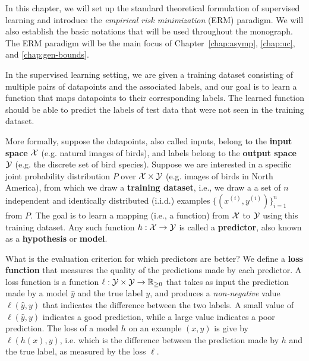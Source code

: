 
\setcounter{section}{0}



In this chapter, we will set up the standard theoretical formulation of supervised learning and introduce the \textit{empirical risk minimization} (ERM) paradigm. 
We will also establish the basic notations that will be used throughout the monograph.
The ERM paradigm will be the main focus of Chapter~\ref{chap:asymp}, \ref{chap:uc}, and \ref{chap:gen-bounds}. 

\label{lec1:sec:sup-learn}
In the supervised learning setting, we are given a training dataset consisting of multiple pairs of datapoints and the associated labels, and our goal is to learn a function that maps datapoints to their corresponding labels. The learned function should be able to predict the labels of test data that were not seen in the training dataset.


More formally, suppose the datapoints, also called inputs,  belong to the \textbf{input space} $\mathcal X$ (e.g. natural images of birds), and labels belong to the \textbf{output space} $\mathcal Y$ (e.g. the discrete set of bird species). Suppose we are interested in a specific joint probability distribution $P$ over $\mathcal X \times \mathcal Y$ (e.g. images of birds in North America), from which we draw a \textbf{training dataset}, i.e., we draw a a set of $n$ independent and identically distributed (i.i.d.) examples $\{(x^{(i)}, y^{(i)})\}_{i=1}^n$ from $P$. The goal is to learn a mapping (i.e., a function) from $\mathcal X$ to $\mathcal Y$ using this training dataset. Any such function $h : \mathcal X \rightarrow \mathcal Y$ is called a \textbf{predictor}, also known as a \textbf{hypothesis} or \textbf{model}.

What is the evaluation criterion for which predictors are better? We define a \textbf{loss function} that measures the quality of the predictions made by each predictor. 
A loss function is a function $\ell : \mathcal Y \times \mathcal Y \rightarrow \mathbb R_{\ge 0}$ that takes as input the prediction made by a model $\hat{y}$ and the true label $y$, and produces a \emph{non-negative} value $\ell(\hat{y}, y)$ that indicates the difference between the two labels. 
A small value of $\ell(\hat{y}, y)$ indicates a good prediction, while a large value indicates a poor prediction. 
The loss of a model $h$ on an example $(x, y)$ is give by $\ell(h(x), y)$, i.e. which is the difference between the prediction made by $h$ and the true label, as measured by the loss $\ell$.


